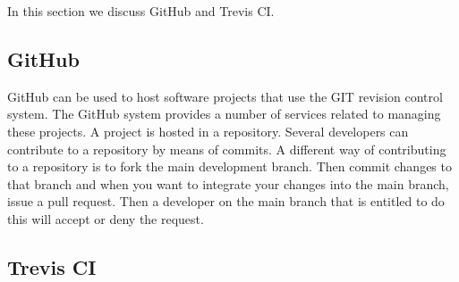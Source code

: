 In this section we discuss GitHub and Trevis CI.

\subsection{GitHub}
GitHub can be used to host software projects that use the GIT revision control system. 
The GitHub system provides a number of services related to managing these projects. 
A project is hosted in a repository. 
Several developers can contribute to a repository by means of commits. 
A different way of contributing to a repository is to fork the main development branch.
Then commit changes to that branch and when you want to integrate your changes into the main branch, issue a pull request.
Then a developer on the main branch that is entitled to do this will accept or deny the request.

\subsection{Trevis CI}